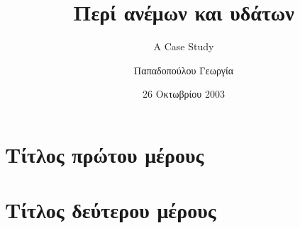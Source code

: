 \documentclass[twoside,a4paper,leqno]{book}
\author{Παπαδοπούλου Γεωργία}
\title{Περί ανέμων και υδάτων}
\subtitle{A Case Study}
\date{26 Οκτωβρίου 2003}
\begin{document}



\tableofcontents



\cleardoublepage


\part{Τίτλος πρώτου μέρους}





\part{Τίτλος δεύτερου μέρους}





\appendix




\backmatter

\printindex

\clearpage


\end{document}

